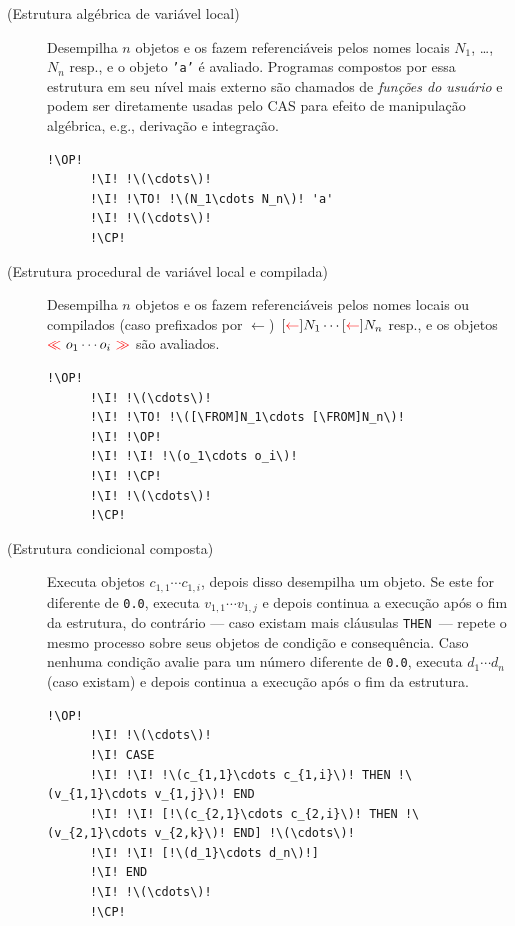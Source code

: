 \documentclass[12pt,a4paper]{report}
\newcommand{\kwd}[1]{\texttt{\textcolor{keyword}{#1}}}
\newcommand{\I}{\enspace\textcolor{indent}\vrule\hspace{2pt}}
\newcommand{\THEN}{\kwd{THEN}}   %
\newcommand{\OP}{\kwd{$\ll$}}   %
\newcommand{\CP}{\kwd{$\gg$}}   %
\newcommand{\TO}{\kwd{$\rightarrow$}} %
\newcommand{\FROM}{\kwd{$\leftarrow$}} %
\numberwithin{theorem}{chapter}
\begin{document}
\begin{description}
  \item[(Estrutura algébrica de variável local)] Desempilha \(n\)
    objetos e os fazem referenciáveis pelos nomes locais \(N_1\),
    \ldots, \(N_n\) resp., e o objeto \texttt{'a'} é avaliado.
    Programas compostos por essa estrutura em seu nível mais externo
    são chamados de \emph{funções do usuário} e podem ser diretamente
    usadas pelo CAS para efeito de manipulação algébrica, e.g.,
    derivação e integração.
    \begin{lstlisting}[language=userrpl,numbers=none]
      !\OP!
      !\I! !\(\cdots\)!
      !\I! !\TO! !\(N_1\cdots N_n\)! 'a'
      !\I! !\(\cdots\)!
      !\CP!
    \end{lstlisting}

  \item[(Estrutura procedural de variável local e compilada)]
    Desempilha \(n\) objetos e os fazem referenciáveis pelos nomes
    locais ou compilados (caso prefixados por \FROM)\ \([\FROM]N_1
    \cdots [\FROM]N_n\) resp., e os objetos \(\OP\ o_1\cdots
    o_i\ \CP\) são avaliados.
    \begin{lstlisting}[language=userrpl,numbers=none]
      !\OP!
      !\I! !\(\cdots\)!
      !\I! !\TO! !\([\FROM]N_1\cdots [\FROM]N_n\)!
      !\I! !\OP!
      !\I! !\I! !\(o_1\cdots o_i\)!
      !\I! !\CP!
      !\I! !\(\cdots\)!
      !\CP!
    \end{lstlisting}

  \item[(Estrutura condicional composta)] Executa objetos
    \(c_{1,1}\cdots c_{1,i}\), depois disso desempilha um objeto.  Se
    este for diferente de \texttt{0.0}, executa \(v_{1,1}\cdots
    v_{1,j}\) e depois continua a execução após o fim da estrutura, do
    contrário --- caso existam mais cláusulas \THEN\ --- repete o
    mesmo processo sobre seus objetos de condição e consequência.
    Caso nenhuma condição avalie para um número diferente de
    \texttt{0.0}, executa \(d_1\cdots d_n\) (caso existam) e depois
    continua a execução após o fim da estrutura.
    \begin{lstlisting}[language=userrpl,numbers=none]
      !\OP!
      !\I! !\(\cdots\)!
      !\I! CASE
      !\I! !\I! !\(c_{1,1}\cdots c_{1,i}\)! THEN !\(v_{1,1}\cdots v_{1,j}\)! END
      !\I! !\I! [!\(c_{2,1}\cdots c_{2,i}\)! THEN !\(v_{2,1}\cdots v_{2,k}\)! END] !\(\cdots\)!
      !\I! !\I! [!\(d_1}\cdots d_n\)!]
      !\I! END
      !\I! !\(\cdots\)!
      !\CP!
    \end{lstlisting}


\end{description}
\end{document}
